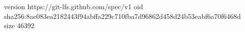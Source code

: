 version https://git-lfs.github.com/spec/v1
oid sha256:8ae083ea2182443f94abffa229c710fba7d96862d458d24b53eabf6a70f6468d
size 46392
